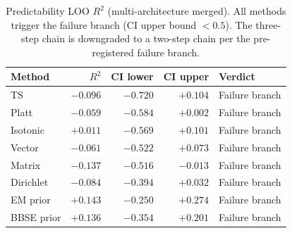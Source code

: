 \documentclass[review,12pt,nonatbib]{elsarticle}
\begin{document}

\begin{table}[t]
\centering
\caption{Predictability LOO $R^2$ (multi-architecture merged). All
methods trigger the failure branch (CI upper bound $<0.5$). The
three-step chain is downgraded to a two-step chain per the
pre-registered failure branch.}
\label{tab:predictability}
\begin{tabular}{lrrrl}
\toprule
Method & $R^2$ & CI lower & CI upper & Verdict \\
\midrule
TS         & $-0.096$ & $-0.720$ & $+0.104$ & Failure branch \\
Platt      & $-0.059$ & $-0.584$ & $+0.002$ & Failure branch \\
Isotonic   & $+0.011$ & $-0.569$ & $+0.101$ & Failure branch \\
Vector     & $-0.061$ & $-0.522$ & $+0.073$ & Failure branch \\
Matrix     & $-0.137$ & $-0.516$ & $-0.013$ & Failure branch \\
Dirichlet  & $-0.084$ & $-0.394$ & $+0.032$ & Failure branch \\
EM prior   & $+0.143$ & $-0.250$ & $+0.274$ & Failure branch \\
BBSE prior & $+0.136$ & $-0.354$ & $+0.201$ & Failure branch \\
\bottomrule
\end{tabular}
\end{table}
\end{document}
